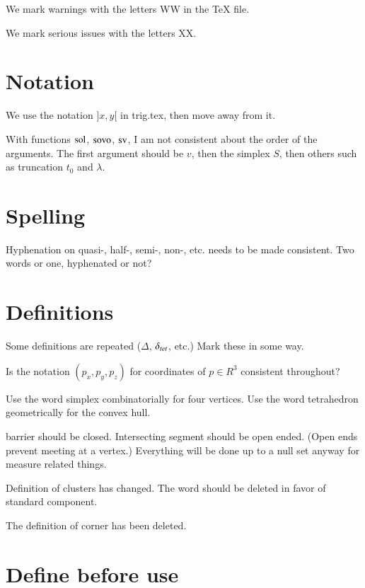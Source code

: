 

\label{XX}\label{tarski:XX}

We mark warnings with the letters WW in 
the TeX file.

We mark serious issues with the letters XX.

\section{Notation}

We use the notation $]x,y[$ in trig.tex, then move away from it.

With functions $\operatorname{sol}$, ${\operatorname{sovo}}$, ${\operatorname{sv}}$, I am not
consistent about the order of the arguments.
The first argument should be $v$, then the simplex $S$,
then others such as truncation $t_0$ and $\lambda$.

\section{Spelling}

Hyphenation on  quasi-, half-, semi-, non-, etc. needs to be made
consistent.  Two words or one, hyphenated or not?



\section{Definitions}

Some definitions are repeated ($\Delta$, $\delta_{tet}$, etc.)
Mark these in some way.

Is the notation $(p_x,p_y,p_z)$ for coordinates 
of $p\in R^3$ consistent throughout?

Use the word simplex combinatorially for four vertices.
Use the word tetrahedron geometrically for the convex hull.

barrier should be closed. Intersecting segment should be open ended.
(Open ends prevent meeting at a vertex.)
Everything will be done up to a null set
anyway for measure related things.

Definition of clusters has changed.  The word should be deleted
in favor of standard component.  

The definition of corner has been deleted.


\section{Define before use}

